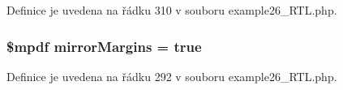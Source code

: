 Definice je uvedena na řádku 310 v souboru example26\-\_\-\-R\-T\-L.\-php.

\hypertarget{example26___r_t_l_8php_a24c284cb7774410f65953584ea1fd9c1}{
\subsubsection[{mirror\-Margins}]{\setlength{\rightskip}{0pt plus 5cm}\$mpdf mirror\-Margins = true}}\label{example26___r_t_l_8php_a24c284cb7774410f65953584ea1fd9c1}


Definice je uvedena na řádku 292 v souboru example26\-\_\-\-R\-T\-L.\-php.


